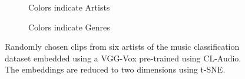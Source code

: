 \begin{figure}[t]
  \centering
  \begin{subfigure}[b]{0.49\linewidth}
    \centering
    \scalebox{0.45}{}
    \caption{Colors indicate Artists}
    \label{fig:tsne_artist}
  \end{subfigure}
  \begin{subfigure}[b]{0.49\linewidth}
    \centering
    \scalebox{0.45}{}
    \caption{Colors indicate Genres}
    \label{fig:tsne_genre}
  \end{subfigure}
  \caption[t-SNE plots of music embeddings]{Randomly chosen clips from six artists of the music classification dataset embedded using a VGG-Vox pre-trained using CL-Audio. The embeddings are reduced to two dimensions using t-SNE.}
  \label{fig:tsne}
\end{figure}
